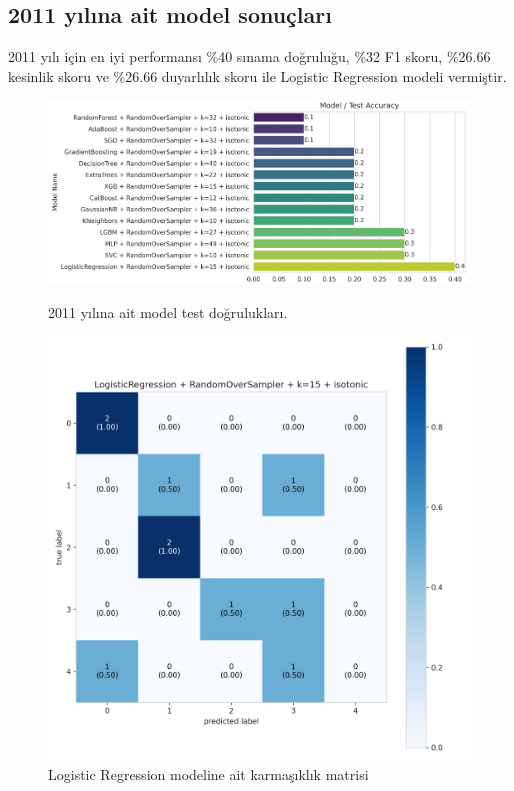 \newpage

\subsection{2011 yılına ait model sonuçları}
2011 yılı için en iyi performansı \%40 sınama doğruluğu,  \%32 F1 skoru, \%26.66 kesinlik skoru ve \%26.66 duyarlılık skoru ile Logistic Regression modeli vermiştir.

\begin{figure}[ht]
\centering
\begin{minipage}[b]{0.6\textwidth}
    \centering
    \includegraphics[width=\textwidth]{2011.png}
    \caption{2011 yılına ait model test doğrulukları.}
    \label{fig:resim1}
\end{minipage}
\hfill
\begin{minipage}[b]{0.6\textwidth}
    \centering
    \includegraphics[width=\textwidth]{2011_cm.png}
    \caption{Logistic Regression modeline ait karmaşıklık matrisi}
    \label{fig:resim2}
\end{minipage}
\end{figure}

